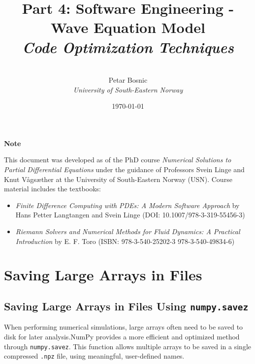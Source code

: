 \documentclass{article}
\title{\textbf{Part 4: Software Engineering - Wave Equation Model
	} \\[0.5em]  %
	\large \textit{Code Optimization Techniques} \\[2em]  %
}
\author{\\[12em]  %
	Petar Bosnic \\[0.5em] %
	\textit{University of South-Eastern Norway} \\[2em]  %
}
\date{\today}
\begin{document}
	
	\maketitle
	\thispagestyle{empty}  %
	
	\vspace{1cm}
	
	\begin{center}
		\textbf{Note}
	\end{center}
	
	\noindent
	This document was developed as of the PhD course \textit{Numerical Solutions to Partial Differential Equations} under the guidance of Professors Svein Linge and Knut Vågsæther at the University of South-Eastern Norway (USN). Course material includes the textbooks:
	
	\begin{itemize}
		\item \textit{Finite Difference Computing with PDEs: A Modern Software Approach} by Hans Petter Langtangen and Svein Linge (DOI: 10.1007/978-3-319-55456-3)
		\item \textit{Riemann Solvers and Numerical Methods for Fluid Dynamics: A Practical Introduction} by E. F. Toro (ISBN: 978-3-540-25202-3 978-3-540-49834-6)
	\end{itemize}
	
	\vspace{1cm}
	
	\newpage  %
	
	\tableofcontents
	\newpage  %
	
	
	\section{Saving Large Arrays in Files}
		\subsection{Saving Large Arrays in Files Using \texttt{numpy.savez}}
			
			When performing numerical simulations, large arrays often need to be saved to disk for later analysis.NumPy provides a more efficient and optimized method through \texttt{numpy.savez}. This function allows multiple arrays to be saved in a single compressed \texttt{.npz} file, using meaningful, user-defined names. 
			
\end{document}
